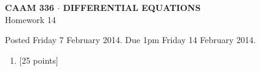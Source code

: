 \documentclass[10pt]{article}
\begin{document}
\vspace*{-5em}
\begin{center}
\large \textsf{\textbf{CAAM 336 $\cdot$ DIFFERENTIAL EQUATIONS}\\[0.5em]
Homework 14 }
\end{center}

Posted Friday 7 February 2014. Due 1pm Friday 14 February 2014.

\begin{enumerate}\addtocounter{enumi}{13}
\item {[25 points]}\\  

\end{enumerate}
\end{document}
